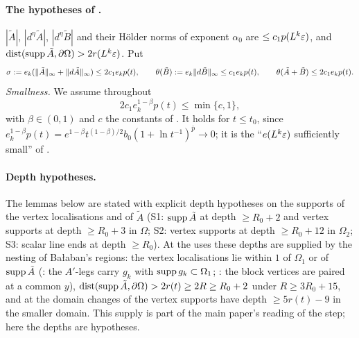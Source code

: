 \paragraph{The hypotheses of \cite[p.~412]{Ba3}.} $|\tilde A|$, $|d^\eta\tilde A|$, $|d^\eta\tilde B|$ and their H\"older norms of exponent $\alpha_0$ are $\le c_1p(L^k\varepsilon)$, and $\operatorname{dist}(\operatorname{supp}\tilde A,\partial\Omega)>2r(L^k\varepsilon)$. Put
\[
\sigma:= e_k(\lVert \tilde A\rVert_\infty+\lVert d\tilde A\rVert_\infty)\le2c_1e_kp(t),\qquad \theta(\tilde B):= e_k\lVert d\tilde B\rVert_\infty\le c_1e_kp(t),\qquad\theta(\tilde A+\tilde B)\le2c_1e_kp(t).
\]
\emph{Smallness.} We assume throughout
\begin{equation}\label{sup1:eq:E}
2c_1e_k^{1-\beta}p(t)\le\min\{c,1\},\tag{E}
\end{equation}
with $\beta\in(0,1)$ and $c$ the constants of \cite[(2.23)]{Ba1}. It holds for $t\le t_0$, since $e_k^{1-\beta}p(t)=e^{1-\beta}t^{(1-\beta)/2}b_0(1+\ln t^{-1})^{\bar p}\to0$; it is the ``$e(L^k\varepsilon)$ sufficiently small'' of \cite[Prop.~2.1]{Ba1}.

\paragraph{Depth hypotheses.} The lemmas below are stated with explicit depth hypotheses on the supports of the vertex localisations and of $\tilde A$ (S1: $\operatorname{supp}\tilde A$ at depth $\ge R_0+2$ and vertex supports at depth $\ge R_0+3$ in $\Omega$; S2: vertex supports at depth $\ge R_0+12$ in $\Omega_2$; S3: scalar line ends at depth $\ge R_0$). At the uses these depths are supplied by the nesting of Ba{\l}aban's regions: the vertex localisations lie within $1$ of $\Omega_1$ or of $\operatorname{supp}\tilde A$ (\cite[p.~412]{Ba3}: the $A'$-legs carry $g_k$ with $\operatorname{supp} g_k\subset\Omega_1$; \cite[p.~414]{Ba3}: the block vertices \cite[(1.13)--(1.15)]{Ba3} are paired at a common $y$), $\operatorname{dist}(\operatorname{supp}\tilde A,\partial\Omega)>2r(t)\ge2R\ge R_0+2$ under $R\ge3R_0+15$, and at the domain changes of \cite[pp.~579--580]{Ba2} the vertex supports have depth $\ge5r(t)-9$ in the smaller domain. This supply is part of the main paper's reading of the step; here the depths are hypotheses.

